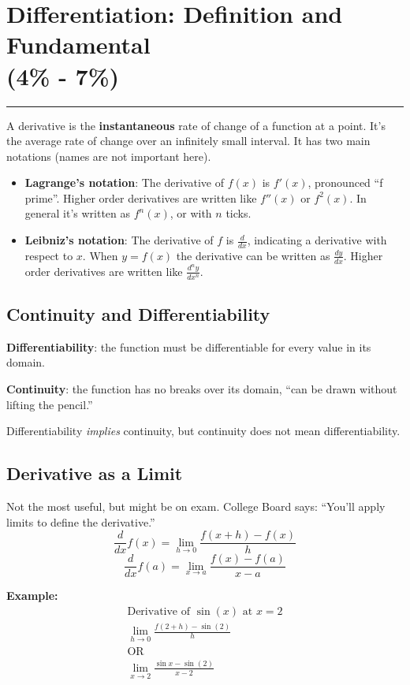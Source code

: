 \documentclass[12pt]{article}
\newcommand{\fline}{\par\noindent\rule{\textwidth}{0.1pt}} %
\begin{document}
\section[Differentiation: Definition and Fundamental Properties (4\% - 7\%)]{Differentiation: Definition and Fundamental \\ (4\% - 7\%)}
\fline

A derivative is the \textbf{instantaneous} rate of change of a function at a point. It's the average rate of change over an infinitely small interval. It has two main notations (names are not important here).
\begin{itemize} %
	\item \textbf{Lagrange's notation}:
	      The derivative of $f(x)$ is $f'(x)$, pronounced ``f prime''. Higher order derivatives are written like $f''(x)$ or $f^2(x)$. In general it's written as $f^{n}(x)$, or with $n$ ticks.
	\item \textbf{Leibniz's notation}:
	      The derivative of $f$ is $\frac{d}{dx}$, indicating a derivative with respect to $x$. When $y=f(x)$ the derivative can be written as $\frac{dy}{dx}$. Higher order derivatives are written like $\frac{d^{n}y}{dx^{n}}$.
\end{itemize}

\subsection{Continuity and Differentiability}
\noindent \textbf{Differentiability}: the function must be differentiable for every value in its domain.

\noindent \textbf{Continuity}: the function has no breaks over its domain, ``can be drawn without lifting the pencil.''

\noindent Differentiability \textit{implies} continuity, but continuity does not mean differentiability.

\subsection{Derivative as a Limit}
Not the most useful, but might be on exam. College Board says: ``You'll apply limits to define the derivative.''
\[ \frac{d}{dx} f(x) = \lim_{h \to 0} \frac{f(x+h) - f(x)}{h} \]
\[ \frac{d}{dx} f(a) = \lim_{x \to a} \frac{f(x) - f(a)}{x-a} \]

\noindent \textbf{Example:}
\begin{gather*}
	\text{Derivative of $\sin(x)$ at $x=2$} \\
	\lim_{h \to 0} \frac{f(2+h) - \sin{(2)}}{h} \\
	\text{OR} \\
	\lim_{x \to 2} \frac{\sin{x} - \sin{(2)}}{x-2}
\end{gather*}
\end{document}
